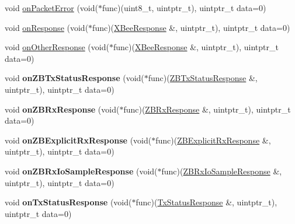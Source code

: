 \begin{DoxyCompactItemize}
\item 
void \hyperlink{class_x_bee_with_callbacks_ad0e1a60d761641e8bd0349a615522b55}{on\+Packet\+Error} (void($\ast$func)(uint8\+\_\+t, uintptr\+\_\+t), uintptr\+\_\+t data=0)
\item 
void \hyperlink{class_x_bee_with_callbacks_ae1044a0b7dcde294bc8bc7d2ef9f68b1}{on\+Response} (void($\ast$func)(\hyperlink{class_x_bee_response}{X\+Bee\+Response} \&, uintptr\+\_\+t), uintptr\+\_\+t data=0)
\item 
void \hyperlink{class_x_bee_with_callbacks_aef62897f97a946cba21ba37c5ee2ef26}{on\+Other\+Response} (void($\ast$func)(\hyperlink{class_x_bee_response}{X\+Bee\+Response} \&, uintptr\+\_\+t), uintptr\+\_\+t data=0)
\item 
\hypertarget{class_x_bee_with_callbacks_a56368dae6464006924b434041f099c15}{}\label{class_x_bee_with_callbacks_a56368dae6464006924b434041f099c15} 
void {\bfseries on\+Z\+B\+Tx\+Status\+Response} (void($\ast$func)(\hyperlink{class_z_b_tx_status_response}{Z\+B\+Tx\+Status\+Response} \&, uintptr\+\_\+t), uintptr\+\_\+t data=0)
\item 
\hypertarget{class_x_bee_with_callbacks_ac07fca96fdcf05dc6c351bcd8d622865}{}\label{class_x_bee_with_callbacks_ac07fca96fdcf05dc6c351bcd8d622865} 
void {\bfseries on\+Z\+B\+Rx\+Response} (void($\ast$func)(\hyperlink{class_z_b_rx_response}{Z\+B\+Rx\+Response} \&, uintptr\+\_\+t), uintptr\+\_\+t data=0)
\item 
\hypertarget{class_x_bee_with_callbacks_a59f65d700b6d7fd143b96ca35370f2cf}{}\label{class_x_bee_with_callbacks_a59f65d700b6d7fd143b96ca35370f2cf} 
void {\bfseries on\+Z\+B\+Explicit\+Rx\+Response} (void($\ast$func)(\hyperlink{class_z_b_explicit_rx_response}{Z\+B\+Explicit\+Rx\+Response} \&, uintptr\+\_\+t), uintptr\+\_\+t data=0)
\item 
\hypertarget{class_x_bee_with_callbacks_aaa3cbb23eda4d4b8ad76e1a4993964d3}{}\label{class_x_bee_with_callbacks_aaa3cbb23eda4d4b8ad76e1a4993964d3} 
void {\bfseries on\+Z\+B\+Rx\+Io\+Sample\+Response} (void($\ast$func)(\hyperlink{class_z_b_rx_io_sample_response}{Z\+B\+Rx\+Io\+Sample\+Response} \&, uintptr\+\_\+t), uintptr\+\_\+t data=0)
\item 
\hypertarget{class_x_bee_with_callbacks_a12d60ecfce4aa1fcbea77e9afdb6b95e}{}\label{class_x_bee_with_callbacks_a12d60ecfce4aa1fcbea77e9afdb6b95e} 
void {\bfseries on\+Tx\+Status\+Response} (void($\ast$func)(\hyperlink{class_tx_status_response}{Tx\+Status\+Response} \&, uintptr\+\_\+t), uintptr\+\_\+t data=0)

\end{DoxyCompactItemize}
